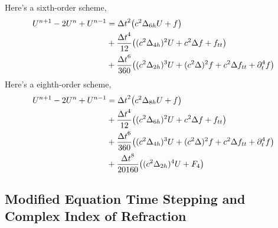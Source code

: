 Here's a sixth-order scheme,
\begin{align*}
  U^{n+1} -2 U ^n + U^{n-1} &= {\Delta t}^2 \big(c^2 \Delta_{6h} U + f \big) \\
                 & + {{\Delta t}^4\over 12} \big( (c^2 \Delta_{4h})^2 U + c^2 \Delta f  + f_{tt} \big) \\
                 & + {{\Delta t}^6\over 360} \big( (c^2 \Delta_{2h})^3 U + (c^2 \Delta)^2 f + c^2 \Delta f_{tt} + \partial_t^4 f \big)
\end{align*}
Here's a eighth-order scheme,
\begin{align*}
   U^{n+1} -2 U ^n + U^{n-1} & = {\Delta t}^2 \big(c^2 \Delta_{8h} U + f \big) \\
                  &  + {{\Delta t}^4\over 12} \big( (c^2 \Delta_{6h})^2 U + c^2 \Delta f  + f_{tt}\big) \\
                  & + {{\Delta t}^6\over 360} \big( (c^2 \Delta_{4h})^3 U + (c^2 \Delta)^2 f + c^2 \Delta f_{tt} + \partial_t^4 f \big) \\
                  & + {{\Delta t}^8\over 20160}\big( (c^2 \Delta_{2h})^4 U + F_4 \big)
\end{align*}

\subsection{Modified Equation Time Stepping and Complex Index of Refraction}

